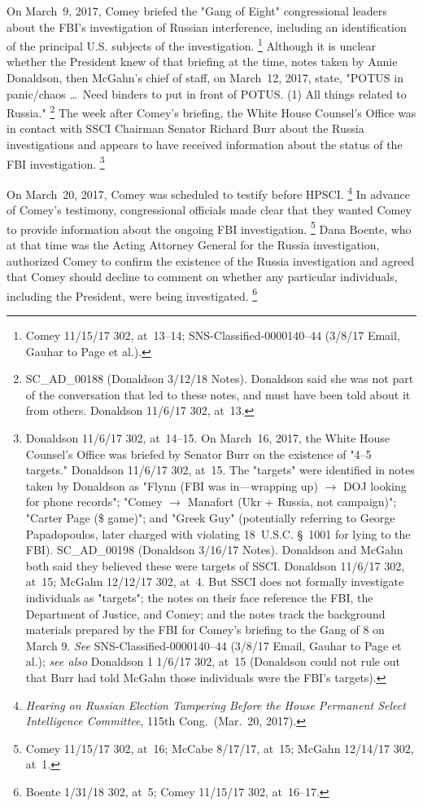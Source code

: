 On March~9, 2017, Comey briefed the "Gang of Eight" congressional leaders about the FBI's investigation of Russian interference, including an identification of the principal U.S. subjects of the investigation.%
\footnote{Comey 11/15/17 302, at~13--14;
SNS-Classified-0000140--44 (3/8/17 Email, Gauhar to Page et al.).}
Although it is unclear whether the President knew of that briefing at the time, notes taken by Annie Donaldson, then McGahn's chief of staff, on March~12, 2017, state, "POTUS in panic/chaos \dots\ Need binders to put in front of POTUS. (1) All things related to Russia."%
\footnote{SC\_AD\_00188 (Donaldson 3/12/18 Notes).
Donaldson said she was not part of the conversation that led to these notes, and must have been told about it from others.
Donaldson 11/6/17 302, at~13.}
The week after Comey's briefing, the White House Counsel's Office was in contact with SSCI Chairman Senator Richard Burr about the Russia investigations and appears to have received information about the status of the FBI investigation.%
\footnote{Donaldson 11/6/17 302, at~14--15.
On March~16, 2017, the White House Counsel's Office was briefed by Senator Burr on the existence of "4--5 targets."
Donaldson 11/6/17 302, at~15.
The "targets" were identified in notes taken by Donaldson as "Flynn (FBI was in---wrapping up) $\longrightarrow$ DOJ looking for phone records";
"Comey $\longrightarrow$ Manafort (Ukr + Russia, not campaign)";
"Carter Page (\$ game)";
and "Greek Guy" (potentially referring to George Papadopoulos, later charged with violating 18~U.S.C. \S~1001 for lying to the FBI).
SC\_AD\_00198 (Donaldson 3/16/17 Notes).
Donaldson and McGahn both said they believed these were targets of SSCI\null.
Donaldson 11/6/17 302, at~15;
McGahn 12/12/17 302, at~4.
But SSCI does not formally investigate individuals as "targets";
the notes on their face reference the FBI, the Department of Justice, and Comey;
and the notes track the background materials prepared by the FBI for Comey's briefing to the Gang of 8 on March 9.
\textit{See} SNS-Classified-0000140--44 (3/8/17 Email, Gauhar to Page et al.);
\textit{see also} Donaldson 1 1/6/17 302, at~15 (Donaldson could not rule out that Burr had told McGahn those individuals were the FBI's targets).}

On March~20, 2017, Comey was scheduled to testify before HPSCI\null.%
\footnote{\textit{Hearing on Russian Election Tampering Before the House Permanent Select Intelligence Committee}, 115th Cong.\ (Mar.~20, 2017).}
In advance of Comey's testimony, congressional officials made clear that they wanted Comey to provide information about the ongoing FBI investigation.%
\footnote{Comey 11/15/17 302, at~16;
McCabe 8/17/17, at~15;
McGahn 12/14/17 302, at~1.}
Dana Boente, who at that time was the Acting Attorney General for the Russia investigation, authorized Comey to confirm the existence of the Russia investigation and agreed that Comey should decline to comment on whether any particular individuals, including the President, were being investigated.%
\footnote{Boente 1/31/18 302, at~5;
Comey 11/15/17 302, at~16--17.}

